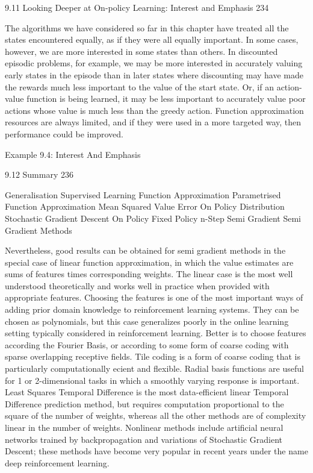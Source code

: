 9.11 Looking Deeper at On-policy Learning: Interest and Emphasis 234

The algorithms we have considered so far in this chapter have treated all the states encountered equally, as if they were all equally important. In some cases, however, we are more interested in some states than others. In discounted episodic problems, for example, we may be more interested in accurately valuing early states in the episode than in later states where discounting may have made the rewards much less important to the value of the start state. Or, if an action-value function is being learned, it may be less important to accurately value poor actions whose value is much less than the greedy action. Function approximation resources are always limited, and if they were used in a more targeted way, then performance could be improved.

Example 9.4: Interest And Emphasis

9.12 Summary 236

Generalisation
Supervised Learning Function Approximation
Parametrised Function Approximation
Mean Squared Value Error
On Policy Distribution
Stochastic Gradient Descent
On Policy
Fixed Policy
n-Step Semi Gradient
Semi Gradient Methods

Nevertheless, good results can be obtained for semi gradient methods in the special case of linear function approximation, in which the value estimates are sums of features times corresponding weights. The linear case is the most well understood theoretically and works well in practice when provided with appropriate features. Choosing the features is one of the most important ways of adding prior domain knowledge to reinforcement learning systems. They can be chosen as polynomials, but this case generalizes poorly in the online learning setting typically considered in reinforcement learning. Better is to choose features according the Fourier Basis, or according to some form of coarse coding with sparse overlapping receptive fields. Tile coding is a form of coarse coding that is particularly computationally ecient and flexible. Radial basis functions are useful for 1 or 2-dimensional tasks in which a smoothly varying response is important. Least Squares Temporal Difference is the most data-efficient linear Temporal Difference prediction method, but requires computation proportional to the square of the number of weights, whereas all the other methods are of complexity linear in the number of weights. Nonlinear methods include artificial neural networks trained by backpropagation and variations of Stochastic Gradient Descent; these methods have become very popular in recent years under the name deep reinforcement learning.

